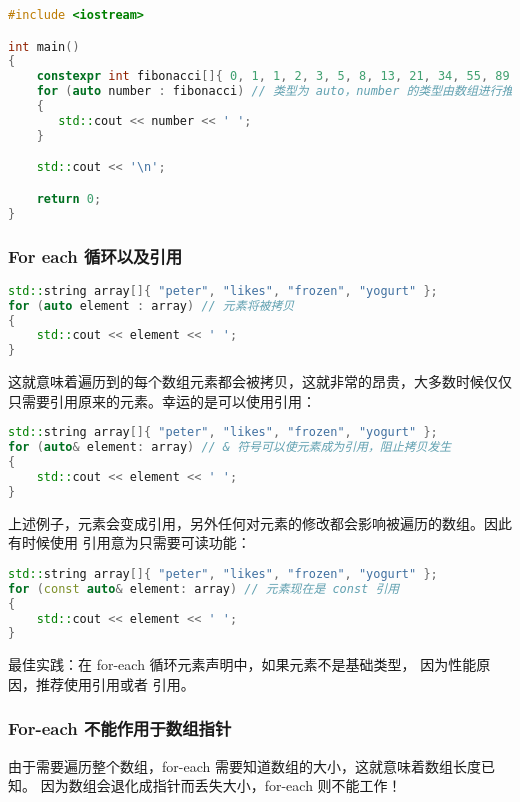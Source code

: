 \documentclass[../../LearnCpp.tex]{subfiles}
\begin{document}
\begin{lstlisting}[language=C++]
#include <iostream>

int main()
{
    constexpr int fibonacci[]{ 0, 1, 1, 2, 3, 5, 8, 13, 21, 34, 55, 89 };
    for (auto number : fibonacci) // 类型为 auto，number 的类型由数组进行推导
    {
       std::cout << number << ' ';
    }

    std::cout << '\n';

    return 0;
}
\end{lstlisting}

\subsubsection*{For each 循环以及引用}

\begin{lstlisting}[language=C++]
std::string array[]{ "peter", "likes", "frozen", "yogurt" };
for (auto element : array) // 元素将被拷贝
{
    std::cout << element << ' ';
}
\end{lstlisting}

这就意味着遍历到的每个数组元素都会被拷贝，这就非常的昂贵，大多数时候仅仅只需要引用原来的元素。幸运的是可以使用引用：

\begin{lstlisting}[language=C++]
std::string array[]{ "peter", "likes", "frozen", "yogurt" };
for (auto& element: array) // & 符号可以使元素成为引用，阻止拷贝发生
{
    std::cout << element << ' ';
}
\end{lstlisting}

上述例子，元素会变成引用，另外任何对元素的修改都会影响被遍历的数组。因此有时候使用  引用意为只需要可读功能：

\begin{lstlisting}[language=C++]
std::string array[]{ "peter", "likes", "frozen", "yogurt" };
for (const auto& element: array) // 元素现在是 const 引用
{
    std::cout << element << ' ';
}
\end{lstlisting}

最佳实践：在 for-each 循环元素声明中，如果元素不是基础类型，
因为性能原因，推荐使用引用或者  引用。

\subsubsection*{For-each 不能作用于数组指针}

由于需要遍历整个数组，for-each 需要知道数组的大小，这就意味着数组长度已知。
因为数组会退化成指针而丢失大小，for-each 则不能工作！
\end{document}
